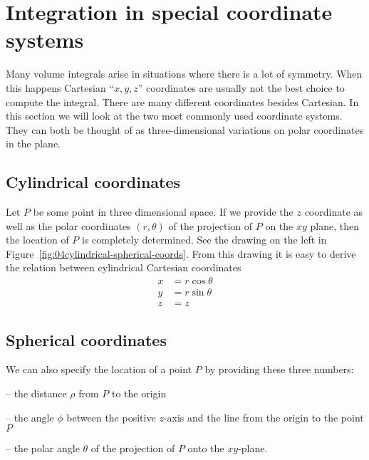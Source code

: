 \section{Integration in special coordinate systems}  
Many volume integrals arise in situations where there is a lot of
symmetry.  When this happens Cartesian ``$x, y, z$'' coordinates are
usually not the best choice to compute the integral.  There are many
different coordinates besides Cartesian.  In this section we will look
at the two most commonly used coordinate systems.  They can both be
thought of as three-dimensional variations on polar coordinates in the
plane.

\subsection{Cylindrical coordinates}  
Let $P$ be some point in three dimensional space.
If we provide the $z$ coordinate as well as the polar coordinates
$(r, \theta)$ of the projection of $P$ on the $xy$ plane, then the
location of $P$ is completely determined.  See the drawing on the left
in Figure~\ref{fig:04cylindrical-spherical-coords}.  From this drawing
it is easy to derive the relation between cylindrical Cartesian
coordinates
\begin{equation}
  \begin{aligned}
    x &= r\cos \theta \\
    y &= r\sin \theta \\
    z &= z
  \end{aligned}
  \label{eq:04cylindrical-to-cartesian}
\end{equation}

\subsection{Spherical coordinates}  \label{sec:spherical-coordinates}
We can also specify the location of a point $P$ by providing these
three numbers:

-- the distance $\rho$ from $P$ to the origin

-- the angle $\phi$ between the positive $z$-axis and the line from
the origin to the point $P$

-- the polar angle $\theta$ of the projection of $P$ onto the
$xy$-plane.


